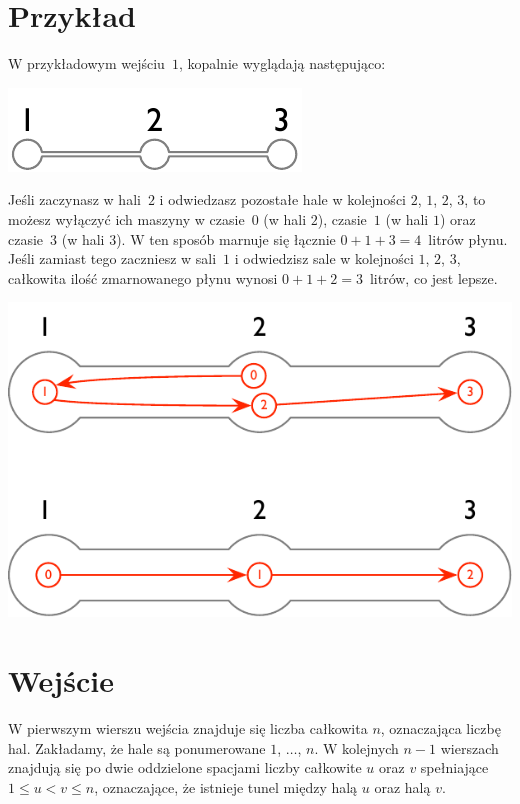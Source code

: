 \section*{Przykład}

W przykładowym wejściu~$1$, kopalnie wyglądają następująco:

\includegraphics[width=.2\textwidth]{img/sample-1.pdf}

Jeśli zaczynasz w hali~$2$ i odwiedzasz pozostałe hale w kolejności $2$, $1$, $2$, $3$, to możesz wyłączyć ich maszyny w czasie~$0$ (w hali $2$), czasie~$1$ (w hali $1$) oraz czasie~$3$ (w hali $3$).
W ten sposób marnuje się łącznie $0+1+3=4$~litrów płynu.
Jeśli zamiast tego zaczniesz w sali~$1$ i odwiedzisz sale w kolejności $1$, $2$, $3$, całkowita ilość zmarnowanego płynu wynosi $0+1+2=3$~litrów, co jest lepsze.

\includegraphics[width=.4\textwidth]{img/sample-1-ans.pdf}

\section*{Wejście}

W pierwszym wierszu wejścia znajduje się liczba całkowita $n$, oznaczająca liczbę hal.
Zakładamy, że hale są ponumerowane $1$, $\ldots$, $n$.
W kolejnych $n-1$ wierszach znajdują się po dwie oddzielone spacjami liczby całkowite $u$ oraz $v$ spełniające
$1\leq u < v \leq n$, %
oznaczające, że istnieje tunel między halą $u$ oraz halą $v$.

